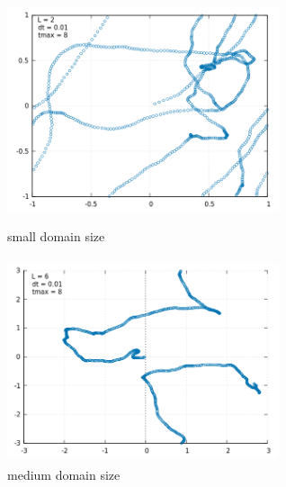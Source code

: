 \documentclass[a4paper,11pt]{article}
\begin{document}
\begin{itemize}
\begin{figure}[!htb]
    \centering
    \begin{minipage}{.5\textwidth}
      \centering
      \includegraphics[width=8cm, height=6cm]{bc1.png}
      \caption{small domain size}
    \end{minipage}%
    \begin{minipage}{.5\textwidth}
      \centering
      \includegraphics[width=8cm, height=6cm]{bc2.png}
      \caption{medium domain size}
    \end{minipage}
\end{figure}


\end{itemize}
\end{document}

